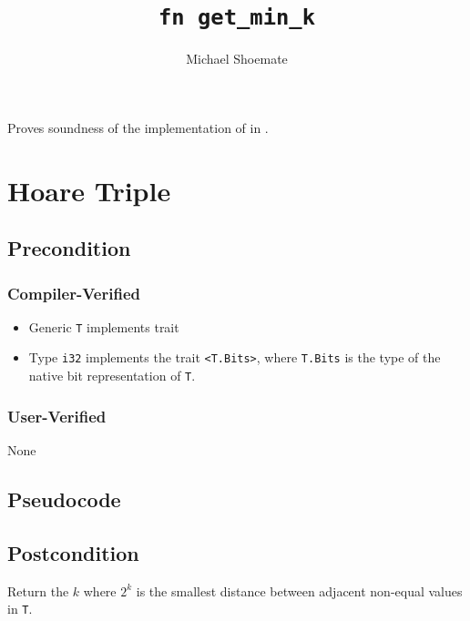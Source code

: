 \documentclass{article}
\title{\texttt{fn get\_min\_k}}
\author{Michael Shoemate}
\date{}
\begin{document}
\maketitle

\contrib
Proves soundness of the implementation of  in .

\section{Hoare Triple}
\subsection*{Precondition}
\subsubsection*{Compiler-Verified}

\begin{itemize}
    \item Generic \texttt{T} implements trait 
    \item Type \texttt{i32} implements the trait \texttt{<T.Bits>},
        where \texttt{T.Bits} is the type of the native bit representation of \texttt{T}.
\end{itemize}

\subsubsection*{User-Verified}
None

\subsection*{Pseudocode}


\subsection*{Postcondition}
\begin{theorem}
    Return the $k$ where $2^k$ is the smallest distance between adjacent non-equal values in \texttt{T}.
\end{theorem}
\end{document}
